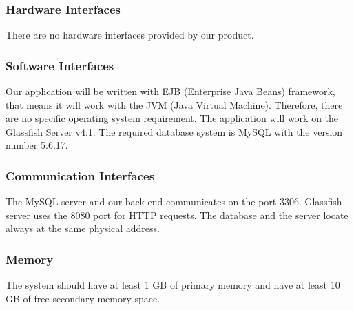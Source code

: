 \subsubsection{Hardware Interfaces}
\quad There are no hardware interfaces provided by our product.

\subsubsection{Software Interfaces}
\quad Our application will be written with EJB (Enterprise Java Beans) framework, that means it will work with the JVM (Java Virtual Machine). Therefore, there are no specific operating system requirement. The application will work on the Glassfish Server v4.1. The required database system is MySQL with the version number 5.6.17.

\subsubsection{Communication Interfaces}
\quad The MySQL server and our back-end communicates on the port 3306. Glassfish server uses the 8080 port for HTTP requests. The database and the server locate always at the same physical address.

\subsubsection{Memory}
\quad The system should have at least 1 GB of primary memory and have at least 10 GB of free secondary memory space.

